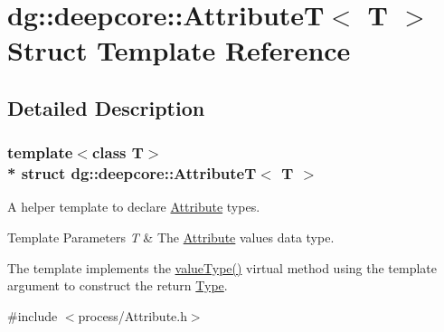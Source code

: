 \hypertarget{structdg_1_1deepcore_1_1_attribute_t}{}\section{dg\+:\+:deepcore\+:\+:AttributeT$<$ T $>$ Struct Template Reference}
\label{structdg_1_1deepcore_1_1_attribute_t}


\subsection{Detailed Description}
\subsubsection*{template$<$class T$>$\\*
struct dg\+::deepcore\+::\+Attribute\+T$<$ T $>$}

A helper template to declare \hyperlink{classdg_1_1deepcore_1_1_attribute}{Attribute} types. 


\begin{DoxyTemplParams}{Template Parameters}
{\em T} & The \hyperlink{classdg_1_1deepcore_1_1_attribute}{Attribute} value\textquotesingle{}s data type.\\
\hline
\end{DoxyTemplParams}
The template implements the \hyperlink{structdg_1_1deepcore_1_1_attribute_t_a01feaa6ee7327284f7e618152f733ff1}{value\+Type()} virtual method using the template argument to construct the return \hyperlink{classdg_1_1deepcore_1_1_type}{Type}. 

{\ttfamily \#include $<$process/\+Attribute.\+h$>$}



